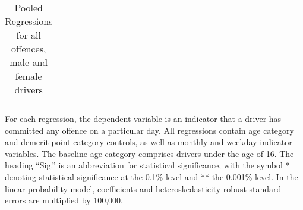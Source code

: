 \begin{table}
\begin{tabular}{l r r r r l r r l}
\hline 

\end{tabular} 
\caption{Pooled Regressions for all offences, male and female drivers} 
For each regression, the dependent variable is an indicator that a driver has committed  
any offence on a particular day.  
All regressions contain age category and demerit point category controls, 
as well as monthly and weekday indicator variables. 
The baseline age category comprises drivers under the age of 16. 
The heading ``Sig.'' is an abbreviation for statistical significance, with 
the symbol * denoting statistical significance at the 0.1\% level 
and ** the 0.001\% level. 
In the linear probability model, coefficients and heteroskedasticity-robust standard errors are  
multiplied by 100,000.  
\label{tab:seas_Logit_vs_LPMx100K_pooled_regs} 
\end{table} 
 
